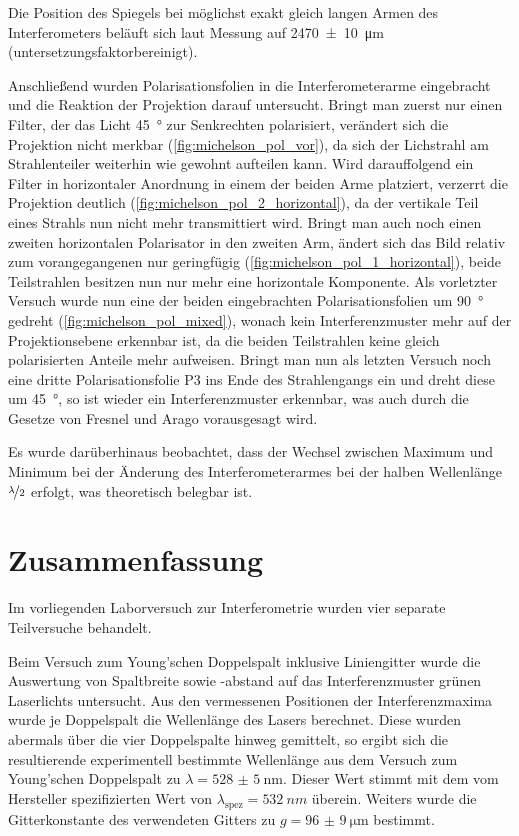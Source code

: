 \documentclass[ngerman]{scrartcl}
\begin{document}
Die Position des Spiegels bei möglichst exakt gleich langen Armen des Interferometers beläuft sich laut Messung auf \SI{2470(10)}{\micro\meter} (untersetzungsfaktorbereinigt).

Anschließend wurden Polarisationsfolien in die Interferometerarme eingebracht und die Reaktion der Projektion darauf untersucht. Bringt man zuerst nur einen Filter, der das Licht \SI{45}{\degree} zur Senkrechten polarisiert, verändert sich die Projektion nicht merkbar (\autoref{fig:michelson_pol_vor}), da sich der Lichstrahl am Strahlenteiler weiterhin wie gewohnt aufteilen kann. Wird darauffolgend ein Filter in horizontaler Anordnung in einem der beiden Arme platziert, verzerrt die Projektion deutlich (\autoref{fig:michelson_pol_2_horizontal}), da der vertikale Teil eines Strahls nun nicht mehr transmittiert wird. Bringt man auch noch einen zweiten horizontalen Polarisator in den zweiten Arm, ändert sich das Bild relativ zum vorangegangenen nur geringfügig (\autoref{fig:michelson_pol_1_horizontal}), beide Teilstrahlen besitzen nun nur mehr eine horizontale Komponente. Als vorletzter Versuch wurde nun eine der beiden eingebrachten Polarisationsfolien um \SI{90}{\degree} gedreht (\autoref{fig:michelson_pol_mixed}), wonach kein Interferenzmuster mehr auf der Projektionsebene erkennbar ist, da die beiden Teilstrahlen keine gleich polarisierten Anteile mehr aufweisen. Bringt man nun als letzten Versuch noch eine dritte Polarisationsfolie P3 ins Ende des Strahlengangs ein und dreht diese um \SI{45}{\degree}, so ist wieder ein Interferenzmuster erkennbar, was auch durch die Gesetze von Fresnel und Arago vorausgesagt wird.

Es wurde darüberhinaus beobachtet, dass der Wechsel zwischen Maximum und Minimum bei der Änderung des Interferometerarmes bei der halben Wellenlänge $\nicefrac{\lambda}{2}$ erfolgt, was theoretisch belegbar ist.



\section{Zusammenfassung}
\label{sec:zusammenfassung}

Im vorliegenden Laborversuch zur Interferometrie wurden vier separate Teilversuche behandelt.

Beim Versuch zum Young'schen Doppelspalt inklusive Liniengitter wurde die Auswertung von Spaltbreite sowie -abstand auf das Interferenzmuster grünen Laserlichts untersucht. Aus den vermessenen Positionen der Interferenzmaxima wurde je Doppelspalt die Wellenlänge des Lasers berechnet. Diese wurden abermals über die vier Doppelspalte hinweg gemittelt, so ergibt sich die resultierende experimentell bestimmte Wellenlänge aus dem Versuch zum Young'schen Doppelspalt zu \(\lambda = \SI{528(5)}{\nano\meter}\). Dieser Wert stimmt mit dem vom Hersteller spezifizierten Wert von $\lambda_{\text{spez}}=\SI{532}{nm}$ überein. Weiters wurde die Gitterkonstante des verwendeten Gitters zu \(g = \SI{96(9)}{\micro\meter}\) bestimmt.
\end{document}

